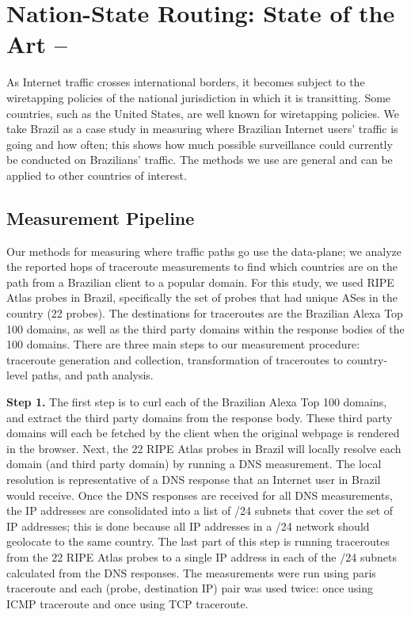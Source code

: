 \section{Nation-State Routing: State of the Art -- }
\label{measure}

As Internet traffic crosses international borders, it becomes subject to the wiretapping policies of the national jurisdiction in which it is transitting.  Some countries, such as the United States, are well known for wiretapping policies.  We take Brazil as a case study in measuring where Brazilian Internet users' traffic is going and how often; this shows how much possible surveillance could currently be conducted on Brazilians' traffic.  The methods we use are general and can be applied to other countries of interest.

\subsection{Measurement Pipeline}
Our methods for measuring where traffic paths go use the data-plane; we analyze the reported hops of traceroute measurements to find which countries are on the path from a Brazilian client to a popular domain.  For this study, we used RIPE Atlas probes in Brazil, specifically the set of probes that had unique ASes in the country (22 probes).  The destinations for traceroutes are the Brazilian Alexa Top 100 domains, as well as the third party domains within the response bodies of the 100 domains.  There are three main steps to our measurement procedure: traceroute generation and collection, transformation of traceroutes to country-level paths, and path analysis.

{\bf Step 1.} The first step is to curl each of the Brazilian Alexa Top 100 domains, and extract the third party domains from the response body.  These third party domains will each be fetched by the client when the original webpage is rendered in the browser.  Next, the 22 RIPE Atlas probes in Brazil will locally resolve each domain (and third party domain) by running a DNS measurement.  The local resolution is representative of a DNS response that an Internet user in Brazil would receive.  Once the DNS responses are received for all DNS measurements, the IP addresses are consolidated into a list of /24 subnets that cover the set of IP addresses; this is done because all IP addresses in a /24 network should geolocate to the same country.  The last part of this step is running traceroutes from the 22 RIPE Atlas probes to a single IP address in each of the /24 subnets calculated from the DNS responses.  The measurements were run using paris traceroute and each (probe, destination IP) pair was used twice: once using ICMP traceroute and once using TCP traceroute.  

